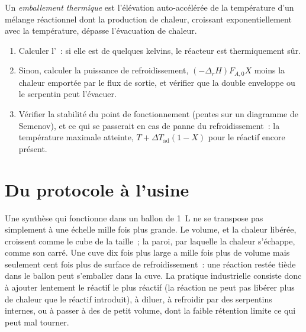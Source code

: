 \begin{definition}\label{def:b2:continuous-reactors:runaway}
Un \emph{emballement thermique} est l'élévation auto-accélérée
de la température d'un mélange réactionnel dont la production de chaleur, croissant
exponentiellement avec la température, dépasse l'évacuation de chaleur.
\end{definition}

\begin{method}\label{met:b2:continuous-reactors:heat-balance}
\begin{enumerate}
  \item Calculer l'~: si elle est de quelques kelvins, le
        réacteur est thermiquement sûr.
  \item Sinon, calculer la puissance de refroidissement, $(-\Delta_r H)F_{A,0}X$ moins la
        chaleur emportée par le flux de sortie, et vérifier que la double enveloppe ou le serpentin
        peut l'évacuer.
  \item Vérifier la stabilité du point de fonctionnement (pentes sur un diagramme de
        Semenov), et ce qui se passerait en cas de panne du refroidissement~: la
        température maximale atteinte, $T + \Delta T_{\text{ad}}(1 - X)$ pour
        le réactif encore présent.
\end{enumerate}
\end{method}

\section{Du protocole à l'usine}

Une synthèse qui fonctionne dans un ballon de \qty{1}{L} ne se transpose pas simplement
à une échelle mille fois plus grande. Le volume, et la chaleur libérée, croissent comme le cube de la
taille~; la paroi, par laquelle la chaleur s'échappe, comme son carré. Une cuve dix
fois plus large a mille fois plus de volume mais seulement cent fois plus de
surface de refroidissement~: une réaction restée tiède dans le ballon peut s'emballer dans
la cuve. La pratique industrielle consiste donc à ajouter lentement le réactif le plus réactif
(la réaction ne peut pas libérer plus de chaleur que le réactif introduit), à diluer,
à refroidir par des serpentins internes, ou à passer à des  de petit volume,
dont la faible rétention limite ce qui peut mal tourner.

